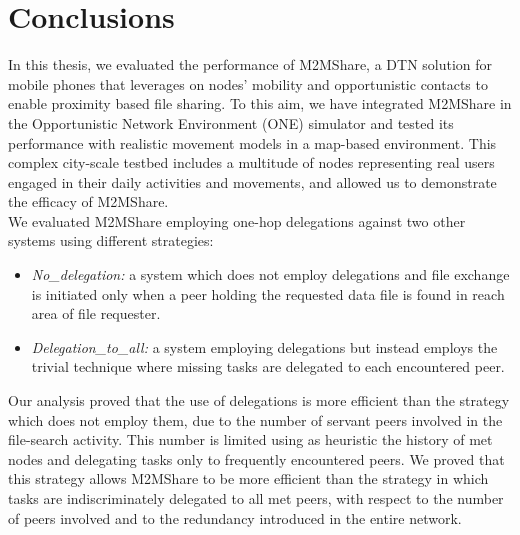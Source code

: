 
\chapter{Conclusions}\label{conclusioni} %





In this thesis, we evaluated the performance of M2MShare, a DTN solution for mobile phones that leverages on nodes' mobility and opportunistic contacts to enable proximity based file sharing. To this aim, we have integrated M2MShare in the Opportunistic Network Environment (ONE) simulator and tested its performance with realistic movement models in a map-based environment. This complex city-scale testbed includes a multitude of nodes representing real users engaged in their daily activities and movements, and allowed us to demonstrate the efficacy of M2MShare. 
\\

We evaluated M2MShare employing one-hop delegations against two other systems using different strategies:
\begin{itemize}
\item \textit{No\_delegation:} a system which does not employ delegations and file exchange is initiated only when a peer holding the requested data file is found in reach area of file requester.
\item \textit{Delegation\_to\_all:} a system employing delegations but instead employs the trivial technique where missing tasks are delegated to each encountered peer.
\end{itemize}
Our analysis proved that the use of delegations is more efficient than the strategy which does not employ them, due to the number of servant peers involved in the file-search activity. This number is limited using as heuristic the history of met nodes and delegating tasks only to frequently encountered peers. We proved that this strategy allows M2MShare to be more efficient than the strategy in which tasks are indiscriminately delegated to all met peers, with respect to the number of peers involved and to the redundancy introduced in the entire network.
\\

